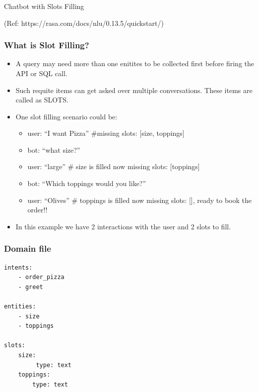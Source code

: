\begin{frame}[fragile]\frametitle{}
\begin{center}
{\Large Chatbot with Slots Filling}
\end{center}

{\tiny (Ref: https://rasa.com/docs/nlu/0.13.5/quickstart/)}
\end{frame}

 \begin{frame}[fragile]\frametitle{What is Slot Filling?}
\begin{itemize}
\item A query may need more than one enitites to be collected first before firing the API or SQL call.
\item Such requite items can get asked over multiple conversations. These items are called as SLOTS.
\item One slot filling scenario could be:
\begin{itemize}
\item user: ``I want Pizza'' \#missing slots: [size, toppings]
\item bot: ``what size?''
\item user: ``large'' \# size is filled now missing slots: [toppings]
\item bot: ``Which toppings would you like?'' 
\item user: ``Olives'' \# toppings is filled now missing slots: [], ready to book the order!!
\end{itemize}
\item In this example we have 2 interactions with the user and 2 slots to fill.
\end{itemize}

\end{frame}


 \begin{frame}[fragile]\frametitle{Domain file}
\begin{lstlisting}
intents:
    - order_pizza
    - greet

entities:
    - size
    - toppings

slots:
    size:
         type: text
    toppings:
        type: text

\end{lstlisting}
\end{frame}




